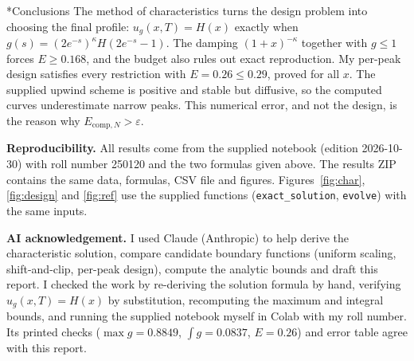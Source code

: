 \documentclass[10pt,a4paper]{article}
\makeatletter
\renewcommand\section{\@startsection{section}{1}{0pt}{6pt}{2pt}{\large\bfseries}}
\makeatother
\begin{document}
\section*{Conclusions}
The method of characteristics turns the design problem into choosing the final profile: $u_g(x,T)=H(x)$ exactly when $g(s)=(2e^{-s})^{\kappa}H(2e^{-s}-1)$. The damping $(1+x)^{-\kappa}$ together with $g\le1$ forces $E\ge0.168$, and the budget also rules out exact reproduction. My per-peak design satisfies every restriction with $E=0.26\le0.29$, proved for all $x$. The supplied upwind scheme is positive and stable but diffusive, so the computed curves underestimate narrow peaks. This numerical error, and not the design, is the reason why $E_{\mathrm{comp},N}>\varepsilon$.

\textbf{Reproducibility.} All results come from the supplied notebook (edition 2026-10-30) with roll number 250120 and the two formulas given above. The results ZIP contains the same data, formulas, CSV file and figures. Figures~\ref{fig:char}, \ref{fig:design} and \ref{fig:ref} use the supplied functions (\texttt{exact\_solution}, \texttt{evolve}) with the same inputs.

\textbf{AI acknowledgement.} I used Claude (Anthropic) to help derive the characteristic solution, compare candidate boundary functions (uniform scaling, shift-and-clip, per-peak design), compute the analytic bounds and draft this report. I checked the work by re-deriving the solution formula by hand, verifying $u_g(x,T)=H(x)$ by substitution, recomputing the maximum and integral bounds, and running the supplied notebook myself in Colab with my roll number. Its printed checks ($\max g=0.8849$, $\int g=0.0837$, $E=0.26$) and error table agree with this report.
\end{document}
